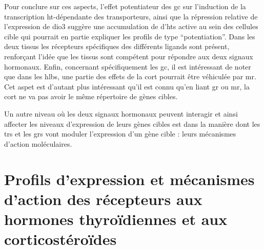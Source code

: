 \documentclass[../main.tex]{subfiles}
\begin{document}
		Pour conclure sur ces aspects, l'effet potentiateur des \gls{gc} sur l'induction de la transcription \gls{ht}-dépendante des transporteurs, ainsi que la répression relative de l'expression de \gls{dio3} suggère une accumulation de d'\glspl{ht} active au sein des cellules cible qui pourrait en partie expliquer les profils de type ``potentiation''.
		Dans les deux tissus les récepteurs spécifiques des différents ligands sont présent, renforçant l'idée que les tissus sont compétent pour répondre aux deux signaux hormonaux.
		Enfin, concernant spécifiquement les \gls{gc}, il est intéressant de noter que dans les \glspl{hlb}, une partie des effets de la \gls{cort} pourrait être véhiculée par \gls{mr}.
		Cet aspet est d'autant plus intéressant qu'il est connu qu'en liant \gls{gr} ou \gls{mr}, la \gls{cort} ne va pas avoir le même répertoire de gènes cibles.
			\par
		Un autre niveau où les deux signaux hormonaux peuvent interagir et ainsi affecter les niveaux d'expression de leurs gènes cibles est dans la manière dont les \glspl{tr} et les \glspl{gr} vont moduler l'expression d'un gène cible :
		leurs mécanismes d'action moléculaires.


\section{Profils d'expression et mécanismes d'action des récepteurs aux hormones thyroïdiennes et aux corticostéroïdes}
\end{document}
